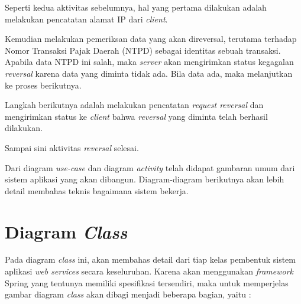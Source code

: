 Seperti kedua aktivitas sebelumnya, hal yang pertama dilakukan adalah melakukan pencatatan alamat IP dari \textit{client}.

Kemudian melakukan pemeriksan data yang akan direversal, terutama terhadap Nomor Transaksi Pajak Daerah (NTPD) sebagai identitas sebuah transaksi. Apabila data NTPD ini salah, maka \textit{server} akan mengirimkan status kegagalan \textit{reversal} karena data yang diminta tidak ada. Bila data ada, maka melanjutkan ke proses berikutnya.

Langkah berikutnya adalah melakukan pencatatan \textit{request reversal} dan mengirimkan status ke \textit{client} bahwa \textit{reversal} yang diminta telah berhasil dilakukan.

Sampai sini aktivitas \textit{reversal} selesai.

Dari diagram \textit{use-case} dan diagram \textit{activity} telah didapat gambaran umum dari sistem aplikasi yang akan dibangun. Diagram-diagram berikutnya akan lebih detail membahas teknis bagaimana sistem bekerja.

\section{Diagram \textit{Class}}

Pada diagram \textit{class} ini, akan membahas detail dari tiap kelas pembentuk sistem aplikasi \textit{web services} secara keseluruhan. Karena akan menggunakan \textit{framework} Spring yang tentunya memiliki spesifikasi tersendiri, maka untuk memperjelas gambar diagram \textit{class} akan dibagi menjadi beberapa bagian, yaitu :

